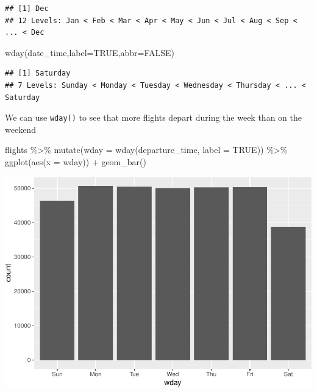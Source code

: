 \documentclass[
]{book}
\newenvironment{Shaded}{\begin{snugshade}}{\end{snugshade}}
\newcommand{\AttributeTok}[1]{\textcolor[rgb]{0.77,0.63,0.00}{#1}}
\newcommand{\ConstantTok}[1]{\textcolor[rgb]{0.00,0.00,0.00}{#1}}
\newcommand{\FunctionTok}[1]{\textcolor[rgb]{0.00,0.00,0.00}{#1}}
\newcommand{\NormalTok}[1]{#1}
\newcommand{\SpecialCharTok}[1]{\textcolor[rgb]{0.00,0.00,0.00}{#1}}
\begin{document}
\begin{verbatim}
## [1] Dec
## 12 Levels: Jan < Feb < Mar < Apr < May < Jun < Jul < Aug < Sep < ... < Dec
\end{verbatim}

\begin{Shaded}
\begin{Highlighting}[]
\FunctionTok{wday}\NormalTok{(date\_time,}\AttributeTok{label=}\ConstantTok{TRUE}\NormalTok{,}\AttributeTok{abbr=}\ConstantTok{FALSE}\NormalTok{)}
\end{Highlighting}
\end{Shaded}

\begin{verbatim}
## [1] Saturday
## 7 Levels: Sunday < Monday < Tuesday < Wednesday < Thursday < ... < Saturday
\end{verbatim}

We can use \texttt{wday()} to see that more flights depart during the week than on the weekend

\begin{Shaded}
\begin{Highlighting}[]
\NormalTok{flights }\SpecialCharTok{\%\textgreater{}\%} 
  \FunctionTok{mutate}\NormalTok{(}\AttributeTok{wday =} \FunctionTok{wday}\NormalTok{(departure\_time, }\AttributeTok{label =} \ConstantTok{TRUE}\NormalTok{)) }\SpecialCharTok{\%\textgreater{}\%} 
  \FunctionTok{ggplot}\NormalTok{(}\FunctionTok{aes}\NormalTok{(}\AttributeTok{x =}\NormalTok{ wday)) }\SpecialCharTok{+}
    \FunctionTok{geom\_bar}\NormalTok{()}
\end{Highlighting}
\end{Shaded}

\includegraphics{bookdown-demo_files/figure-latex/unnamed-chunk-76-1.pdf}
\end{document}
